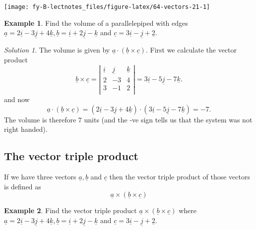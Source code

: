\documentclass[
  11pt,
  oneside]{book}
\newcommand{\slide}{}
\theoremstyle{definition}
\theoremstyle{definition}
\newtheorem{example}{Example}[chapter]
\theoremstyle{definition}
\theoremstyle{definition}
\theoremstyle{remark}
\newtheorem*{solution}{Solution}
\begin{document}
\begin{center}\texttt{[image: fy-B-lectnotes\_files/figure-latex/64-vectors-21-1]} \end{center}

\slide

\begin{example}
Find the volume of a parallelepiped with edges \(\underline a = 2\underline i - 3\underline j + 4\underline k, \underline b = \underline i + 2\underline j - \underline k\) and \(\underline c = 3\underline i - \underline j + \underline 2\).
\end{example}

\begin{solution}
The volume is given by \(\underline a \cdot(\underline b\times\underline c)\). First we calculate the vector product
\[
\underline b \times\underline c = \left|\begin{array}{ccc}\underline i&\underline j&\underline k\\2&-3&4\\3&-1&2\\\end{array}\right| = 3\underline i-5\underline j-7\underline k.
\]
and now
\[
\underline a \cdot(\underline b\times\underline c) = (2\underline i - 3\underline j + 4\underline k)\cdot(3\underline i-5\underline j-7\underline k) = -7.
\]
The volume is therefore \(7\) units (and the -ve sign tells us that the system was not right handed).
\end{solution}

\slide

\subsection{The vector triple product}\label{the-vector-triple-product}

If we have three vectors \(\underline a, \underline b\) and \(\underline c\) then the vector triple product of those vectors is defined as
\[
\underline a \times (\underline b \times\underline c)
\]

\begin{example}
Find the vector triple product \(\underline a \times (\underline b \times\underline c)\) where \(\underline a = 2\underline i - 3\underline j + 4\underline k, \underline b = \underline i + 2\underline j - \underline k\) and \(\underline c = 3\underline i - \underline j + \underline 2\).
\end{example}
\end{document}
